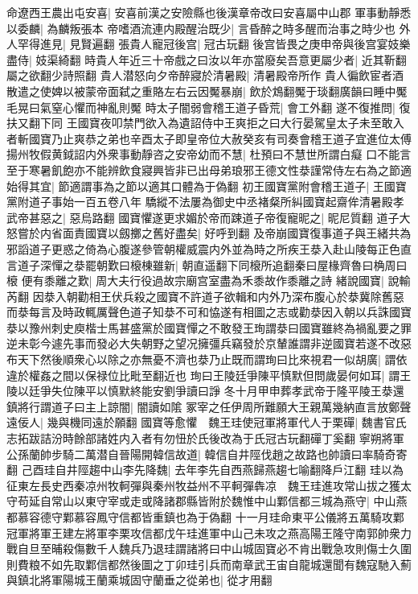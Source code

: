 命遼西王農出屯安喜|{
	安喜前漢之安險縣也後漢章帝改曰安喜屬中山郡}
軍事動靜悉以委麟|{
	為麟叛張本}
帝嗜酒流連内殿醒治既少|{
	言昏醉之時多醒而治事之時少也}
外人罕得進見|{
	見賢遍翻}
張貴人寵冠後宫|{
	冠古玩翻}
後宫皆畏之庚申帝與後宫宴妓樂盡侍|{
	妓渠綺翻}
時貴人年近三十帝戲之曰汝以年亦當廢矣吾意更屬少者|{
	近其靳翻屬之欲翻少詩照翻}
貴人潜怒向夕帝醉寢於清暑殿|{
	清暑殿帝所作}
貴人徧飲宦者酒散遣之使婢以被蒙帝面弑之重賂左右云因魘暴崩|{
	飲於鴆翻魘于琰翻廣韻曰睡中魘毛晃曰氣窒心懼而神亂則魘}
時太子闇弱會稽王道子昏荒|{
	會工外翻}
遂不復推問|{
	復扶又翻下同}
王國寶夜叩禁門欲入為遺詔侍中王爽拒之曰大行晏駕皇太子未至敢入者斬國寶乃止爽恭之弟也辛酉太子即皇帝位大赦癸亥有司奏會稽王道子宜進位太傅揚州牧假黄鉞詔内外衆事動靜咨之安帝幼而不慧|{
	杜預曰不慧世所謂白癡}
口不能言至于寒暑飢飽亦不能辨飲食寢興皆非已出母弟琅邪王德文性㳟謹常侍左右為之節適始得其宜|{
	節適謂事為之節以適其口體為于偽翻}
初王國寶黨附會稽王道子|{
	王國寶黨附道子事始一百五卷八年}
驕縱不法屢為御史中丞褚粲所糾國寶起齋侔清暑殿孝武帝甚惡之|{
	惡烏路翻}
國寶懼遂更求媚於帝而踈道子帝復寵昵之|{
	昵尼質翻}
道子大怒嘗於内省面責國寶以劔擲之舊好盡矣|{
	好呼到翻}
及帝崩國寶復事道子與王緒共為邪謟道子更惑之倚為心腹遂參管朝權威震内外並為時之所疾王㳟入赴山陵每正色直言道子深憚之㳟罷朝歎曰榱棟雖新|{
	朝直遥翻下同榱所追翻秦曰屋椽齊魯曰桷周曰榱}
便有黍離之歎|{
	周大夫行役過故宗廟宫室盡為禾黍故作黍離之詩}
緒說國寶|{
	說輸芮翻}
因㳟入朝勸相王伏兵殺之國寶不許道子欲輯和内外乃深布腹心於㳟冀除舊惡而㳟每言及時政輒厲聲色道子知㳟不可和恊遂有相圖之志或勸㳟因入朝以兵誅國寶㳟以豫州刺史庾楷士馬甚盛黨於國寶憚之不敢發王珣謂㳟曰國寶雖終為禍亂要之罪逆未彰今遽先事而發必大失朝野之望况擁彊兵竊發於京輦誰謂非逆國寶若遂不改惡布天下然後順衆心以除之亦無憂不濟也㳟乃止既而謂珣曰比來視君一似胡廣|{
	謂依違於權姦之間以保禄位比毗至翻近也}
珣曰王陵廷爭陳平慎默但問歲晏何如耳|{
	謂王陵以廷爭失位陳平以慎默終能安劉爭讀曰諍}
冬十月甲申葬孝武帝于隆平陵王㳟還鎮將行謂道子曰主上諒闇|{
	闇讀如隂}
冢宰之任伊周所難願大王親萬幾納直言放鄭聲遠佞人|{
	幾與機同遠於願翻}
國寶等愈懼　魏王珪使冠軍將軍代人于栗磾|{
	魏書官氏志拓跋詰汾時餘部諸姓内入者有勿忸於氏後改為于氏冠古玩翻磾丁奚翻}
寧朔將軍公孫蘭帥步騎二萬潜自晉陽開韓信故道|{
	韓信自井陘伐趙之故路也帥讀曰率騎奇寄翻}
己酉珪自井陘趨中山李先降魏|{
	去年李先自西燕歸燕趨七喻翻降戶江翻}
珪以為征東左長史西秦凉州牧軻彈與秦州牧益州不平軻彈犇凉　魏王珪進攻常山拔之獲太守苟延自常山以東守宰或走或降諸郡縣皆附於魏惟中山鄴信都三城為燕守|{
	中山燕都慕容德守鄴慕容鳳守信都皆重鎮也為于偽翻}
十一月珪命東平公儀將五萬騎攻鄴冠軍將軍王建左將軍李栗攻信都戊午珪進軍中山己未攻之燕高陽王隆守南郭帥衆力戰自旦至晡殺傷數千人魏兵乃退珪謂諸將曰中山城固寶必不肯出戰急攻則傷士久圍則費粮不如先取鄴信都然後圖之丁卯珪引兵而南章武王宙自龍城還聞有魏寇馳入薊與鎮北將軍陽城王蘭乘城固守蘭垂之從弟也|{
	從才用翻}
